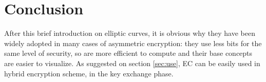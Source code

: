 \documentclass{article}
\begin{document}
\section{Conclusion}

After this brief introduction on elliptic curves, it is obvious why they have been widely adopted in many cases of asymmetric encryption: they use less bits for the same level of security, so are more efficient to compute and their base concepts are easier to visualize. As suggested on section \ref{sec:use}, EC can be easily used in hybrid encryption scheme, in the key exchange phase.






\end{document}
